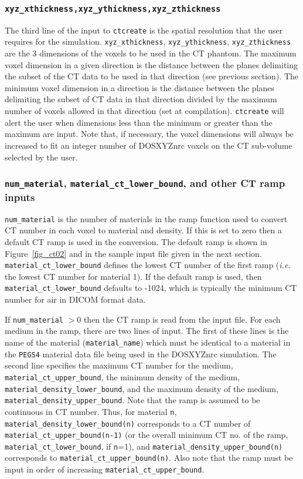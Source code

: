 \documentclass[12pt,twoside]{article}      %
\newcommand{\indexm}[1]{\index{#1}}
\begin{document}
\subsubsection{{\tt xyz\_xthickness,xyz\_ythickness,xyz\_zthickness}}
\indexm{CT!phantom voxels}
\indexm{voxel size}
\indexm{xyz\_xthickness}
The third line of the input to {\tt ctcreate} is the
spatial resolution that the user requires for the simulation.
{\tt xyz\_xthickness}, {\tt xyz\_ythickness}, {\tt xyz\_zthickness}
are the 3 dimensions of the voxels to be used in the CT phantom.
The maximum voxel dimension in a given direction is
the distance between the planes delimiting the subset of the CT data
to be used in that direction (see previous section).
The minimum voxel dimension in a direction is the distance between
the planes delimiting the subset of CT data in that direction divided
by the maximum number of voxels allowed in that direction (set at
compilation).
{\tt ctcreate} will alert the user when dimensions less than the minimum
or greater than the maximum are input.  Note that, if necessary, the voxel
dimensions will always be increased to fit an integer number of DOSXYZnrc
voxels on the CT sub-volume selected by the user.

\subsubsection{{\tt num\_material}, {\tt material\_ct\_lower\_bound}, and other CT ramp inputs}
\indexm{CT!ramp}

{\tt num\_material} is the
number of materials in the ramp function used
to convert CT number in each voxel to material and density.
If this is set to zero then a
default CT ramp is used in the conversion. The default ramp
is shown in Figure~\ref{fig_ct02} and in the sample input file given in the next section.
{\tt material\_ct\_lower\_bound} defines the lowest CT number of the first ramp
({\it i.e.} the lowest CT number for material  1).  If the default ramp is used, then {\tt material\_ct\_lower\_bound} defaults
to -1024, which is typically the minimum CT number for air in DICOM format data.

If {\tt num\_material} $>$0 then
the CT ramp is read from
the input file.  For each medium in the ramp, there are
two lines of input. \indexm{CT!ramp}
The first of these lines is the name of the material
({\tt material\_name}) which must be identical to a material in the
{\tt PEGS4} material data file being used in the DOSXYZnrc simulation.
The second line specifies the maximum CT number for the medium, {\tt material\_ct\_upper\_bound},
the minimum density of the medium, {\tt material\_density\_lower\_bound}, and the maximum
density of the medium,
{\tt material\_density\_upper\_bound}. Note that the ramp is assumed to be continuous
in CT number.  Thus, for material {\tt n}, {\tt material\_density\_lower\_bound(n)} corresponds
to a CT number of {\tt material\_ct\_upper\_bound(n-1)} (or the overall
minimum CT no. of the ramp, {\tt material\_ct\_lower\_bound}, if
{\tt n}=1), and {\tt material\_density\_upper\_bound(n)} corresponds to
{\tt material\_ct\_upper\_bound(n)}.
Also note that the ramp must be input in order of
increasing {\tt material\_ct\_upper\_bound}.
\end{document}
